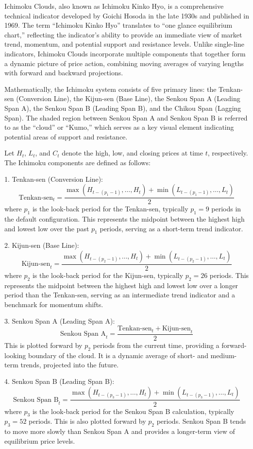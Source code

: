 Ichimoku Clouds, also known as Ichimoku Kinko Hyo, is a comprehensive technical indicator developed by Goichi Hosoda in the late 1930s and published in 1969. The term “Ichimoku Kinko Hyo” translates to “one glance equilibrium chart,” reflecting the indicator’s ability to provide an immediate view of market trend, momentum, and potential support and resistance levels. Unlike single-line indicators, Ichimoku Clouds incorporate multiple components that together form a dynamic picture of price action, combining moving averages of varying lengths with forward and backward projections.

Mathematically, the Ichimoku system consists of five primary lines: the Tenkan-sen (Conversion Line), the Kijun-sen (Base Line), the Senkou Span A (Leading Span A), the Senkou Span B (Leading Span B), and the Chikou Span (Lagging Span). The shaded region between Senkou Span A and Senkou Span B is referred to as the “cloud” or “Kumo,” which serves as a key visual element indicating potential areas of support and resistance.

Let $H_t$, $L_t$, and $C_t$ denote the high, low, and closing prices at time $t$, respectively. The Ichimoku components are defined as follows:

1. Tenkan-sen (Conversion Line):
\[
\text{Tenkan-sen}_t = \frac{\max(H_{t-(p_1-1)}, \dots, H_t) + \min(L_{t-(p_1-1)}, \dots, L_t)}{2}
\]
where $p_1$ is the look-back period for the Tenkan-sen, typically $p_1 = 9$ periods in the default configuration. This represents the midpoint between the highest high and lowest low over the past $p_1$ periods, serving as a short-term trend indicator.

2. Kijun-sen (Base Line):
\[
\text{Kijun-sen}_t = \frac{\max(H_{t-(p_2-1)}, \dots, H_t) + \min(L_{t-(p_2-1)}, \dots, L_t)}{2}
\]
where $p_2$ is the look-back period for the Kijun-sen, typically $p_2 = 26$ periods. This represents the midpoint between the highest high and lowest low over a longer period than the Tenkan-sen, serving as an intermediate trend indicator and a benchmark for momentum shifts.

3. Senkou Span A (Leading Span A):
\[
\text{Senkou Span A}_t = \frac{\text{Tenkan-sen}_t + \text{Kijun-sen}_t}{2}
\]
This is plotted forward by $p_2$ periods from the current time, providing a forward-looking boundary of the cloud. It is a dynamic average of short- and medium-term trends, projected into the future.

4. Senkou Span B (Leading Span B):
\[
\text{Senkou Span B}_t = \frac{\max(H_{t-(p_3-1)}, \dots, H_t) + \min(L_{t-(p_3-1)}, \dots, L_t)}{2}
\]
where $p_3$ is the look-back period for the Senkou Span B calculation, typically $p_3 = 52$ periods. This is also plotted forward by $p_2$ periods. Senkou Span B tends to move more slowly than Senkou Span A and provides a longer-term view of equilibrium price levels.

